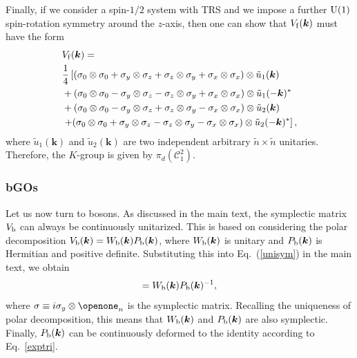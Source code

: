 \documentclass[prl,twocolumn,preprintnumbers,superscriptaddress,amsmath,amssymb]{revtex4-1}
\begin{document}
Finally, if we consider a spin-$1/2$ system with TRS and we impose a further ${\rm U}(1)$ spin-rotation symmetry around the $z$-axis, then one can show that $V_{\rm f}(\boldsymbol{k})$ must have the form
\begin{equation}
\begin{split}
&V_{\rm f}(\boldsymbol{k}) = \\
&\frac{1}{4}\left[ (\sigma_0\otimes\sigma_0 + \sigma_y\otimes\sigma_z + \sigma_z\otimes\sigma_y + \sigma_x\otimes\sigma_x)\otimes \tilde u_1(\boldsymbol{k})\right.\\
&+(\sigma_0\otimes\sigma_0 - \sigma_y\otimes\sigma_z - \sigma_z\otimes\sigma_y + \sigma_x\otimes\sigma_x)\otimes \tilde u_1(-\boldsymbol{k})^* \\
&+(\sigma_0\otimes\sigma_0 - \sigma_y\otimes\sigma_z + \sigma_z\otimes\sigma_y - \sigma_x\otimes\sigma_x)\otimes \tilde u_2(\boldsymbol{k})\\
&\left.+(\sigma_0\otimes\sigma_0 + \sigma_y\otimes\sigma_z - \sigma_z\otimes\sigma_y - \sigma_x\otimes\sigma_x)\otimes \tilde u_2(-\boldsymbol{k})^* \right],
\end{split}
\label{AIIIV}
\end{equation}
where $\tilde u_1(\boldsymbol{k})$ and $\tilde u_2(\boldsymbol{k})$ are two independent arbitrary $\tilde n\times \tilde n$ unitaries. Therefore, the $K$-group is given by $\pi_d(\mathcal{C}_1^2)$. 

\subsubsection{bGOs}
Let us now turn to bosons. As discussed in the main text, the symplectic matrix $V_{\rm b}$ can always be continuously unitarized. This is based on considering the polar decomposition $V_{\rm b}(\boldsymbol{k}) = W_{\rm b}(\boldsymbol{k}) P_{\rm b}(\boldsymbol{k})$, where $W_{\rm b}(\boldsymbol{k})$ is unitary and $P_{\rm b}(\boldsymbol{k})$ is Hermitian and positive definite. Substituting this into Eq.~(\ref{unisym}) in the main text, we obtain
\begin{equation}
[-\sigma W_{\rm b}(\boldsymbol{k})\sigma][- \sigma P_{\rm b}(\boldsymbol{k})\sigma] =W_{\rm b}(\boldsymbol{k}) P_{\rm b}(\boldsymbol{k})^{-1},
\end{equation}
where $\sigma\equiv i\sigma_y\otimes\openone_n$ is the symplectic matrix. Recalling the uniqueness of polar decomposition, this means that $W_{\rm b}(\boldsymbol{k})$ and $P_{\rm b}(\boldsymbol{k})$ are also symplectic. Finally, $P_{\rm b}(\boldsymbol{k})$ can be continuously deformed to the identity according to Eq.~\eqref{exptri}.
\end{document}
